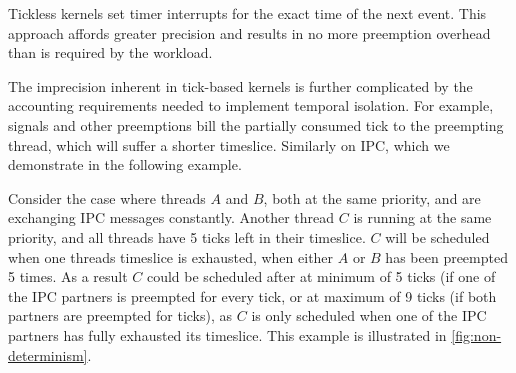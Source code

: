 Tickless kernels set timer interrupts for the exact time of the next event.  This approach affords
greater precision and results in no more preemption overhead than is required by the workload.

The imprecision inherent in tick-based kernels is further complicated by the accounting requirements
needed to implement temporal isolation. For example, signals and other
preemptions bill the partially consumed tick to the preempting thread, which will suffer a shorter timeslice.
Similarly on \gls{IPC},  which we demonstrate in the following example. 

Consider the case where threads $A$ and $B$, both at the same priority, and are
exchanging IPC messages constantly.  Another thread $C$ is running at the same
priority, and all threads have 5 ticks left in their timeslice.  $C$ will be scheduled
when one threads timeslice is exhausted, \ie when either $A$ or $B$ has been
preempted 5 times.  As a result $C$ could be
scheduled after at minimum of 5 ticks (if one of the
\gls{IPC} partners is preempted for every tick, or at maximum of 9
 ticks (if both partners are preempted for
ticks), as $C$ is only scheduled when one of the IPC partners has fully exhausted its timeslice.
This example is illustrated in \cref{fig:non-determinism}.

